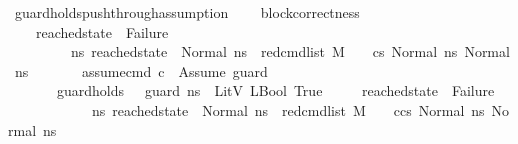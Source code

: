 \begin{isabellebody}
\endisatagproof
{\isafoldproof}%
%
\isadelimproof
\isanewline
%
\endisadelimproof
\isanewline
{}\isamarkupfalse%
\ guard{\isacharunderscore}{\kern0pt}holds{\isacharunderscore}{\kern0pt}push{\isacharunderscore}{\kern0pt}through{\isacharunderscore}{\kern0pt}assumption{\isacharcolon}{\kern0pt}\ \isanewline
\ \ \ block{\isacharunderscore}{\kern0pt}correctness{\isacharcolon}{\kern0pt}\ \ \isanewline
\ \ \ \ {\isachardoublequoteopen}reached{\isacharunderscore}{\kern0pt}state\ {\isasymnoteq}\ Failure\ {\isasymand}\ \isanewline
\ \ \ \ \ \ \ \ {\isacharparenleft}{\kern0pt}{\isasymforall}\ ns{}{\isacharprime}{\kern0pt}{\isachardot}{\kern0pt}\ reached{\isacharunderscore}{\kern0pt}state\ {\isacharequal}{\kern0pt}\ Normal\ ns{}{\isacharprime}{\kern0pt}\ {\isasymlongrightarrow}\ {\isacharparenleft}{\kern0pt}red{\isacharunderscore}{\kern0pt}cmd{\isacharunderscore}{\kern0pt}list\ M\ {\isasymLambda}\ {\isasymGamma}\ {\isasymOmega}\ {\isacharparenleft}{\kern0pt}cs{}{\isacharparenright}{\kern0pt}\ {\isacharparenleft}{\kern0pt}Normal\ ns{}{\isacharparenright}{\kern0pt}\ {\isacharparenleft}{\kern0pt}Normal\ ns{}{\isacharprime}{\kern0pt}{\isacharparenright}{\kern0pt}{\isacharparenright}{\kern0pt}{\isacharparenright}{\kern0pt}{\isachardoublequoteclose}\isanewline
\ \ \ \ \ \ \ assume{\isacharunderscore}{\kern0pt}cmd{\isacharcolon}{\kern0pt}\ {\isachardoublequoteopen}c\ {\isacharequal}{\kern0pt}\ Assume\ guard{\isachardoublequoteclose}\isanewline
\ \ \ \ \ \ \ guard{\isacharunderscore}{\kern0pt}holds{\isacharcolon}{\kern0pt}\ {\isachardoublequoteopen}{\isasymLambda}{\isacharcomma}{\kern0pt}{\isasymGamma}{\isacharcomma}{\kern0pt}{\isasymOmega}\ {\isasymturnstile}\ {\isasymlangle}guard{\isacharcomma}{\kern0pt}\ ns{}{\isasymrangle}\ {\isasymDown}\ LitV\ {\isacharparenleft}{\kern0pt}LBool\ True{\isacharparenright}{\kern0pt}{\isachardoublequoteclose}\isanewline
\ \ \ \ \ {\isachardoublequoteopen}reached{\isacharunderscore}{\kern0pt}state\ {\isasymnoteq}\ Failure\ {\isasymand}\ \isanewline
\ \ \ \ \ \ \ \ \ \ \ {\isacharparenleft}{\kern0pt}{\isasymforall}\ ns{}{\isacharprime}{\kern0pt}{\isachardot}{\kern0pt}\ reached{\isacharunderscore}{\kern0pt}state\ {\isacharequal}{\kern0pt}\ Normal\ ns{}{\isacharprime}{\kern0pt}\ {\isasymlongrightarrow}\ {\isacharparenleft}{\kern0pt}red{\isacharunderscore}{\kern0pt}cmd{\isacharunderscore}{\kern0pt}list\ M\ {\isasymLambda}\ {\isasymGamma}\ {\isasymOmega}\ {\isacharparenleft}{\kern0pt}c{\isacharhash}{\kern0pt}cs{}{\isacharparenright}{\kern0pt}\ {\isacharparenleft}{\kern0pt}Normal\ ns{}{\isacharparenright}{\kern0pt}\ {\isacharparenleft}{\kern0pt}Normal\ ns{}{\isacharprime}{\kern0pt}{\isacharparenright}{\kern0pt}{\isacharparenright}{\kern0pt}{\isacharparenright}{\kern0pt}{\isachardoublequoteclose}\ \isanewline

\end{isabellebody}
